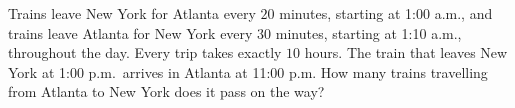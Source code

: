 Trains leave New York for Atlanta every $20$ minutes, starting at 1:00 a.m., and trains leave Atlanta for New York every $30$ minutes, starting at 1:10 a.m., throughout the day. Every trip takes exactly $10$ hours. The train that leaves New York at 1:00 p.m.\ arrives in Atlanta at 11:00 p.m. How many trains travelling from Atlanta to New York does it pass on the way?
